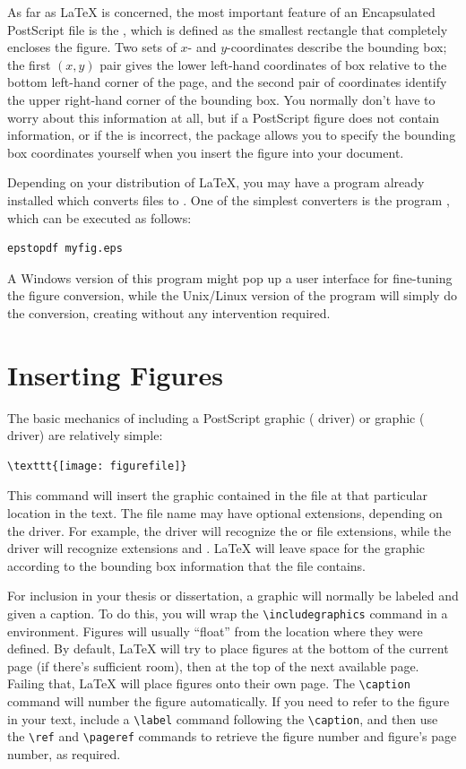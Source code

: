As far as \LaTeX{} is concerned, the most important feature of an
Encapsulated PostScript file is the , which is
defined as the smallest rectangle that completely encloses the figure.
Two sets of $x$- and $y$-coordinates describe the bounding box; the
first $(x,y)$ pair gives the lower left-hand coordinates of box
relative to the bottom left-hand corner of the page, and the second
pair of coordinates identify the upper right-hand corner of the
bounding box.  You normally don't have to worry about this information
at all, but if a PostScript figure does not contain
 information, or if the  is
incorrect, the  package allows you to specify the
bounding box coordinates yourself when you insert the figure into your
document.

Depending on your distribution of \LaTeX, you may have a program
already installed which converts  files to .
One of the simplest converters is the program , which
can be executed as follows:
\begin{verbatim}
epstopdf myfig.eps
\end{verbatim}
A Windows version of this program might pop up a user interface for
fine-tuning the figure conversion, while the Unix/Linux version of the
program will simply do the conversion, creating 
without any intervention required.

\section{Inserting Figures}
The basic mechanics of including a PostScript graphic (
driver) or  graphic ( driver) are relatively
simple:
\begin{verbatim}
\texttt{[image: figurefile]}
\end{verbatim}
This command will insert the graphic contained in the file
 at that particular location in the text.  The file
name may have optional extensions, depending on the driver.  For
example, the  driver will recognize the  or
 file extensions, while the  driver will
recognize extensions  and .  \LaTeX{} will leave
space for the graphic according to the bounding box information that
the file contains.

For inclusion in your thesis or dissertation, a graphic will normally
be labeled and given a caption.  To do this, you will wrap the
\verb|\includegraphics| command in a  environment.
Figures will usually ``float'' from the location where they were
defined.  By default, \LaTeX{} will try to place figures at the bottom
of the current page (if there's sufficient room), then at the top of
the next available page.  Failing that, \LaTeX{} will place figures
onto their own page.  The \verb|\caption| command will number the
figure automatically.  If you need to refer to the figure in your
text, include a \verb|\label| command following the \verb|\caption|,
and then use the \verb|\ref| and \verb|\pageref| commands to
retrieve the figure number and figure's page number, as required.

